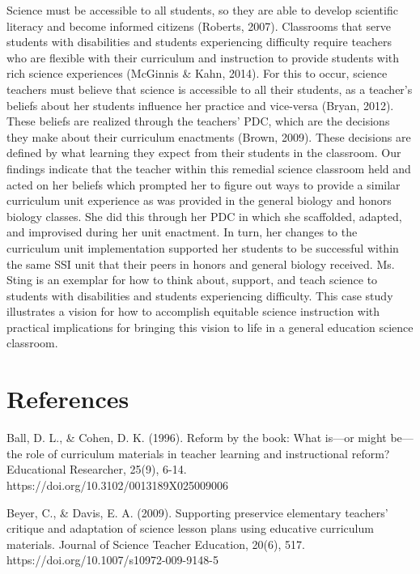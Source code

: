 \documentclass[11.5pt]{sig-alternate}
\begin{document}
\begin{large}
Science must be accessible to all students, so they are able to develop scientific literacy and become informed citizens (Roberts, 2007). Classrooms that serve students with disabilities and students experiencing difficulty require teachers who are flexible with their curriculum and instruction to provide students with rich science experiences (McGinnis \& Kahn, 2014). For this to occur, science teachers must believe that science is accessible to all their students, as a teacher’s beliefs about her students influence her practice and vice-versa (Bryan, 2012). These beliefs are realized through the teachers’ PDC, which are the decisions they make about their curriculum enactments (Brown, 2009). These decisions are defined by what learning they expect from their students in the classroom. Our findings indicate that the teacher within this remedial science classroom held and acted on her beliefs which prompted her to figure out ways to provide a similar curriculum unit experience as was provided in the general biology and honors biology classes. She did this through her PDC in which she scaffolded, adapted, and improvised during her unit enactment. In turn, her changes to the curriculum unit implementation supported her students to be successful within the same SSI unit that their peers in honors and general biology received. Ms. Sting is an exemplar for how to think about, support, and teach science to students with disabilities and students experiencing difficulty. This case study illustrates a vision for how to accomplish equitable science instruction with practical implications for bringing this vision to life in a general education science classroom.


\clearpage
\section*{References}\par 

\leftskip 0.25in
\parindent -0.25in 

Ball, D. L., \& Cohen, D. K. (1996). Reform by the book: What is—or might be—the role of curriculum materials in teacher learning and instructional reform? Educational Researcher, 25(9), 6-14. \\https://doi.org/10.3102/0013189X025009006

Beyer, C., \& Davis, E. A. (2009). Supporting preservice elementary teachers’ critique and adaptation of science lesson plans using educative curriculum materials. Journal of Science Teacher Education, 20(6), 517. https://doi.org/10.1007/s10972-009-9148-5


\end{large}
\end{document}
